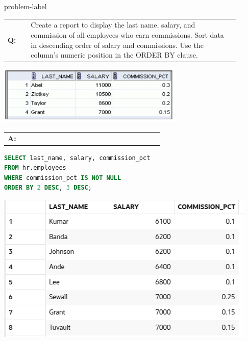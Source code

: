 \begin{problem}{}{problem-label}

\begin{tabular}{@{}l p{0.9\linewidth}@{}}
  \textbf{Q:} & Create a report to display the last name, salary, and commission of all employees who earn commissions. Sort data in descending order of salary and commissions. Use the column’s numeric position in the ORDER BY clause.
\end{tabular}

\begin{center}
  \includegraphics[scale=0.8]{images/c2q9.png}
\end{center}

\begin{tabular}{@{}l p{0.9\linewidth}@{}}
  \textbf{A:} & 
\end{tabular}

\begin{lstlisting}[language=SQL]
SELECT last_name, salary, commission_pct
FROM hr.employees
WHERE commission_pct IS NOT NULL
ORDER BY 2 DESC, 3 DESC;
\end{lstlisting}

\vspace{1em}

\begin{center}
  \includegraphics[scale=0.8]{images/c2a9.png}
\end{center}

\end{problem}

